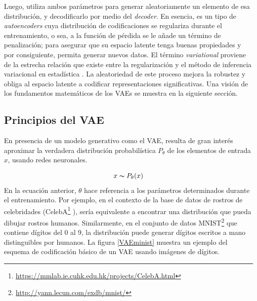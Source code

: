  Luego, utiliza ambos parámetros para generar aleatoriamente un elemento de esa distribución, y decodificarlo por medio del \textit{decoder}. En esencia, es un tipo de \textit{autoencoders} cuya distribución de codificaciones se regulariza durante el entrenamiento, o sea, a la función de pérdida se le añade un término de penalización; para asegurar que su espacio latente tenga buenas propiedades y por consiguiente, permita generar nuevos datos. El término \textit{variational} proviene de la estrecha relación que existe entre la regularización y el método de inferencia variacional en estadística \cite{Chollet}. La aleatoriedad de este proceso mejora la robustez y obliga al espacio latente a codificar representaciones significativas. Una visión de los fundamentos matemáticos de los VAEs se muestra en la siguiente sección.

\subsection{Principios del VAE}

En presencia de un modelo generativo como el VAE, resulta de gran interés aproximar la verdadera distribución probabilística $P_{\theta}$ de los elementos de entrada $x$, usando redes neuronales. 

\begin{equation}
	x \thicksim P_{\theta}(x)
\end{equation}
En la ecuación anterior, $\theta$ hace referencia a los parámetros determinados durante el entrenamiento. Por ejemplo, en el contexto de la base de datos de rostros de celebridades (CelebA\footnote{\url{https://mmlab.ie.cuhk.edu.hk/projects/CelebA.html}} ), sería equivalente a encontrar una distribución que pueda dibujar rostros humanos. Similarmente, en el conjunto de datos MNIST\footnote{\url{http://yann.lecun.com/exdb/mnist/}} que contiene dígitos del 0 al 9, la distribución puede generar dígitos escritos a mano distinguibles por humanos. La figura \ref{VAEminist} muestra un ejemplo del esquema de codificación básico de un VAE usando imágenes de dígitos.



